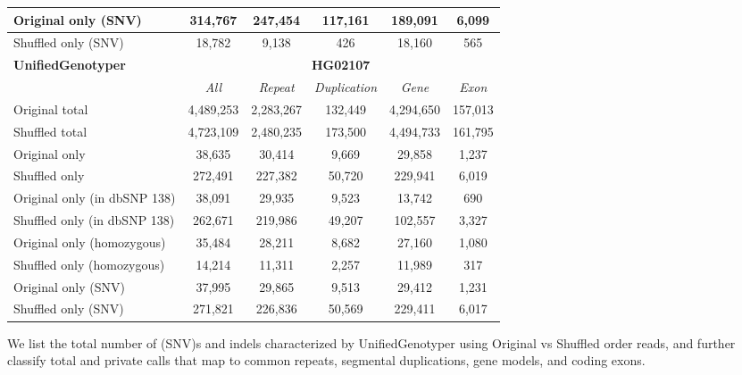 {\begin{table}[htb]
\begin{center}
\begin{tabular}{|l|c||c|c|c|c|}
                  \hline
                  Original only (SNV) & 314,767 & 247,454 & 117,161 & 189,091 & 6,099 \\
                  \hline
                  Shuffled only (SNV) & 18,782 & 9,138 & 426 & 18,160 & 565 \\ 
                  \hline
                  \hline
                      {\bf UnifiedGenotyper} & \multicolumn{5}{|c|}{\bf HG02107} \\
                      \hline
                      \cline{2-6}
                            {\bf} & {\it All} & {\it Repeat} & {\it Duplication} & {\it Gene} & {\it Exon} \\
                            \hline
                            Original total & 4,489,253 & 2,283,267 & 132,449 & 4,294,650 & 157,013 \\
                            \hline
                            Shuffled total & 4,723,109 & 2,480,235 & 173,500 & 4,494,733 & 161,795 \\
                            \hline
                            Original only & 38,635 & 30,414 & 9,669 & 29,858 & 1,237 \\
                            \hline
                            Shuffled only & 272,491 & 227,382 & 50,720 & 229,941 & 6,019 \\
                            \hline
                            Original only (in dbSNP 138) & 38,091 & 29,935 & 9,523 & 13,742 & 690 \\
                            \hline
                            Shuffled only (in dbSNP 138) & 262,671 & 219,986 & 49,207 & 102,557 & 3,327 \\
                            \hline
                            Original only (homozygous) & 35,484 & 28,211 & 8,682 & 27,160 & 1,080 \\
                            \hline
                            Shuffled only (homozygous) & 14,214 & 11,311 & 2,257 & 11,989 & 317 \\
                            \hline
                            Original only (SNV) & 37,995 & 29,865 & 9,513 & 29,412 & 1,231 \\
                            \hline
                            Shuffled only (SNV) & 271,821 & 226,836 & 50,569 & 229,411 & 6,017 \\ 
                            \hline
      \end{tabular}
    \end{center}
        {\footnotesize We list the total number of (SNV)s and indels characterized by UnifiedGenotyper using Original vs Shuffled order reads, 
          and further classify total and private calls that map to common repeats, segmental duplications, gene models, and coding exons.}
        \label{supptab:orig-vs-shuf-ug}
  \end{table}
}

